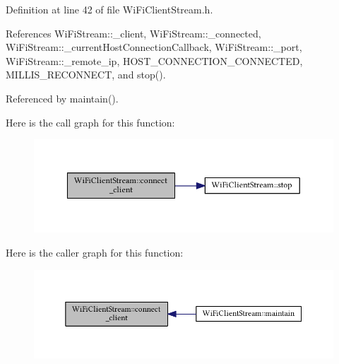 Definition at line 42 of file Wi\+Fi\+Client\+Stream.\+h.



References Wi\+Fi\+Stream\+::\+\_\+client, Wi\+Fi\+Stream\+::\+\_\+connected, Wi\+Fi\+Stream\+::\+\_\+current\+Host\+Connection\+Callback, Wi\+Fi\+Stream\+::\+\_\+port, Wi\+Fi\+Stream\+::\+\_\+remote\+\_\+ip, H\+O\+S\+T\+\_\+\+C\+O\+N\+N\+E\+C\+T\+I\+O\+N\+\_\+\+C\+O\+N\+N\+E\+C\+T\+ED, M\+I\+L\+L\+I\+S\+\_\+\+R\+E\+C\+O\+N\+N\+E\+CT, and stop().



Referenced by maintain().



Here is the call graph for this function\+:\nopagebreak
\begin{figure}[H]
\begin{center}
\leavevmode
\includegraphics[width=350pt]{class_wi_fi_client_stream_afb68ea613d492a7b3aebca60ed5a0da6_cgraph}
\end{center}
\end{figure}




Here is the caller graph for this function\+:\nopagebreak
\begin{figure}[H]
\begin{center}
\leavevmode
\includegraphics[width=350pt]{class_wi_fi_client_stream_afb68ea613d492a7b3aebca60ed5a0da6_icgraph}
\end{center}
\end{figure}


